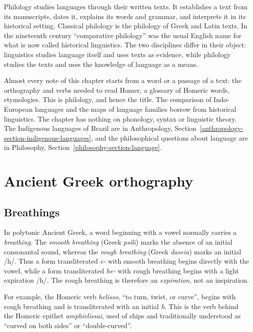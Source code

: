 Philology studies languages through their
written texts. It establishes a text from
its manuscripts, dates it, explains its
words and grammar, and interprets it in its
historical setting. Classical philology is
the philology of Greek and Latin texts. In
the nineteenth century ``comparative
philology'' was the usual English name for
what is now called historical linguistics.
The two disciplines differ in their object:
linguistics studies language itself and
uses texts as evidence, while philology
studies the texts and uses the knowledge of
language as a means.

Almost every note of this chapter starts
from a word or a passage of a text: the
orthography and verbs needed to read Homer,
a glossary of Homeric words, etymologies.
This is philology, and hence the title. The
comparison of Indo-European languages and
the maps of language families borrow from
historical linguistics. The chapter has
nothing on phonology, syntax or linguistic
theory. The Indigenous languages of Brazil
are in Anthropology,
Section~\ref{anthropology-section-indigenous-languages},
and the philosophical questions about
language are in Philosophy,
Section~\ref{philosophy-section-language}.

\section{Ancient Greek orthography}
\label{section-ancient-greek-orthography}

\subsection{Breathings}
\label{subsection-breathings}

In polytonic Ancient Greek, a word beginning with a vowel normally carries a
\emph{breathing}.  The \emph{smooth breathing} (Greek \emph{psili}) marks the
absence of an initial consonantal sound, whereas the \emph{rough breathing}
(Greek \emph{daseia}) marks an initial /h/.  Thus a form transliterated
\emph{e-} with smooth breathing begins directly with the vowel, while a form
transliterated \emph{he-} with rough breathing begins with a light expiration
/h/.  The rough breathing is therefore an \emph{expiration}, not an
inspiration.

For example, the Homeric verb \emph{helisso}, ``to turn, twist, or curve'',
begins with rough breathing and is transliterated with an initial \emph{h}.
This is the verb behind the Homeric epithet \emph{amphielissai}, used of ships
and traditionally understood as ``curved on both sides'' or ``double-curved''.

